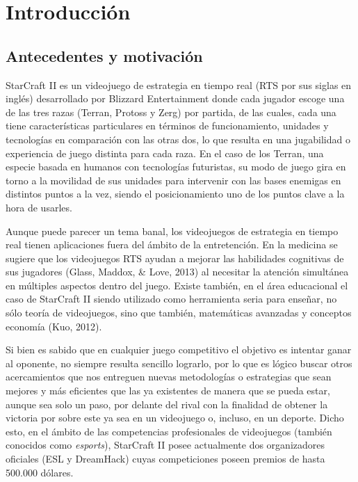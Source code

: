 \newcommand*{\captionsource}[1]{%
 \caption[{#1}]{%
 #1%
 \\\hspace{\linewidth}%
 \textbf{Fuente:} Elaboración propia, 2021%
 }%
}

\newcommand*{\captionimg}[2]{%
 \caption[{#1}]{%
 #1%
 \\\hspace{\linewidth}%
 \textbf{Fuente:} #2%
 }%
}


\chapter{Introducci\'on}
\label{cap:introduccion}

\section{Antecedentes y motivaci\'on}
\label{intro:motivacion}
StarCraft II es un videojuego de estrategia en tiempo real (RTS por sus siglas en inglés) desarrollado por Blizzard Entertainment donde cada jugador escoge una de las tres razas (Terran, Protoss y Zerg) por partida, de las cuales, cada una tiene características particulares en términos de funcionamiento, unidades y tecnologías en comparación con las otras dos, lo que resulta en una jugabilidad o experiencia de juego distinta para cada raza. En el caso de los Terran, una especie basada en humanos con tecnologías futuristas, su modo de juego gira en torno a la movilidad de sus unidades para intervenir con las bases enemigas en distintos puntos a la vez, siendo el posicionamiento uno de los puntos clave a la hora de usarles.

Aunque puede parecer un tema banal, los videojuegos de estrategia en tiempo real tienen aplicaciones fuera del ámbito de la entretención. En la medicina se sugiere que los videojuegos RTS ayudan a mejorar las habilidades cognitivas de sus jugadores  (Glass, Maddox, \& Love, 2013) al necesitar la atención simultánea en múltiples aspectos dentro del juego. Existe también, en el área educacional el caso de StarCraft II siendo utilizado como herramienta seria para enseñar, no sólo teoría de videojuegos, sino que también, matemáticas avanzadas y conceptos economía (Kuo, 2012).

Si bien es sabido que en cualquier juego competitivo el objetivo es intentar ganar al oponente, no siempre resulta sencillo lograrlo, por lo que es lógico buscar otros acercamientos que nos entreguen nuevas metodologías o estrategias que sean mejores y más eficientes que las ya existentes de manera que se pueda estar, aunque sea solo un paso, por delante del rival con la finalidad de obtener la victoria por sobre este ya sea en un videojuego o, incluso, en un deporte. Dicho esto, en el ámbito de las competencias profesionales de videojuegos (también conocidos como \textit{esports}), StarCraft II posee actualmente dos organizadores oficiales (ESL y DreamHack) cuyas competiciones poseen premios de hasta 500.000 dólares.

